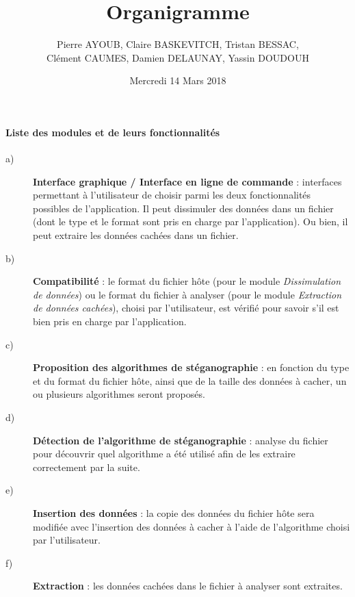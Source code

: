 \documentclass[11pt]{article}
\title{Organigramme}
\author{Pierre AYOUB, Claire BASKEVITCH, Tristan BESSAC, \\
Clément CAUMES, Damien DELAUNAY, Yassin DOUDOUH}
\date{Mercredi 14 Mars 2018}
\begin{document}
\hspace{1cm}

\paragraph{Liste des modules et de leurs fonctionnalités}
\begin{description}
\item[a)] \textbf{Interface graphique / Interface en ligne de commande} : interfaces permettant à l'utilisateur de choisir parmi les deux fonctionnalités possibles de l'application. 
Il peut dissimuler des données dans un fichier (dont le type et le format sont pris en charge par l'application). Ou bien, il peut extraire les données cachées dans un fichier. 

\item[b)] \textbf{Compatibilité} : le format du fichier hôte (pour le module \textit{Dissimulation de données}) ou le format du fichier à analyser (pour le module \textit{Extraction de données cachées}), 
choisi par l'utilisateur, est vérifié pour savoir s'il est bien pris en charge par l'application. 

\item[c)] \textbf{Proposition des algorithmes de stéganographie} : en fonction du type et du format du fichier hôte, ainsi que de la taille des données à cacher, 
un ou plusieurs algorithmes seront proposés. 

\item[d)] \textbf{Détection de l'algorithme de stéganographie} : analyse du fichier pour découvrir quel algorithme a été utilisé afin de les extraire correctement par la suite. 

\item[e)] \textbf{Insertion des données} : la copie des données du fichier hôte sera modifiée avec l'insertion des données à cacher à l'aide de l'algorithme choisi par l'utilisateur. 

\item[f)] \textbf{Extraction} : les données cachées dans le fichier à analyser sont extraites. 

\end{description}
\end{document}
